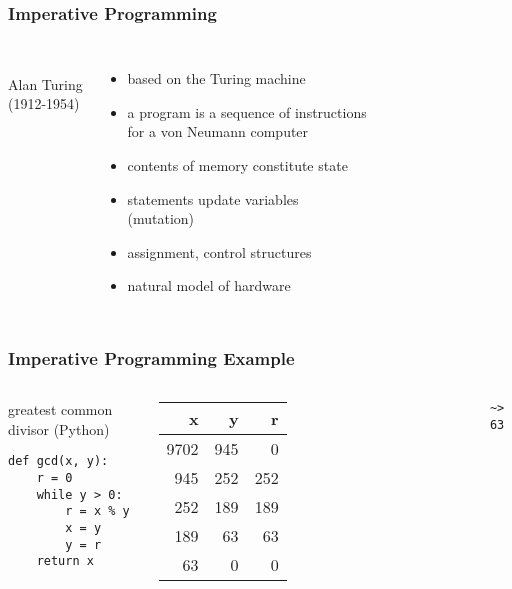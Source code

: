 \documentclass[dvipsnames]{beamer}
\theoremstyle{plain}
\begin{document}
\begin{frame}
  \frametitle{Imperative Programming}

  \begin{columns}
    \begin{center}
      \\
      Alan Turing\\
      (1912-1954)
    \end{center}

    \begin{itemize}
      \item based on the Turing machine
      \item a program is a sequence of instructions\\
        for a von Neumann computer
      \item contents of memory constitute \alert{state}
      \item statements update variables\\
        (\alert{mutation})
      \item assignment, control structures
      \item natural model of hardware
    \end{itemize}
  \end{columns}
\end{frame}

\begin{frame}[fragile]
  \frametitle{Imperative Programming Example}

  \begin{columns}[b]
    \begin{exampleblock}{greatest common divisor (Python)}
      \begin{lstlisting}
def gcd(x, y):
    r = 0
    while y > 0:
        r = x % y
        x = y
        y = r
    return x
      \end{lstlisting}
    \end{exampleblock}

    \begin{tabular}{|r|r|r|}\hline
   x &   y &   r\\\hline\hline
9702 & 945 &   0\\\hline
 945 & 252 & 252\\\hline
 252 & 189 & 189\\\hline
 189 &  63 &  63\\\hline
  63 &   0 &   0\\\hline
    \end{tabular}

    \medskip
    \lstinline|~> 63|
  \end{columns}
\end{frame}
\end{document}
